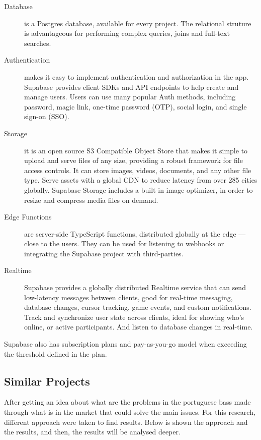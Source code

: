 \begin{description}
    \item [Database] is a Postgres database, available for every project. The relational struture is advantageous for performing complex queries, joins and full-text searches\cite{ZewdieAyezabu2022}.
    \item[Authentication] makes it easy to implement authentication and authorization in the app. Supabase provides client SDKs and API endpoints to help create and manage users. Users can use many popular Auth methods, including password, magic link, one-time password (OTP), social login, and single sign-on (SSO).\cite{supabaseAuth}
    \item[Storage] it is an open source S3 Compatible Object Store that makes it simple to upload and serve files of any size, providing a robust framework for file access controls. It can store images, videos, documents, and any other file type. Serve assets with a global CDN to reduce latency from over 285 cities globally. Supabase Storage includes a built-in image optimizer, in order to resize and compress media files on demand\cite{supabaseStorage}.
    \item [Edge Functions] are server-side TypeScript functions, distributed globally at the edge — close to the users. They can be used for listening to webhooks or integrating the Supabase project with third-parties.\cite{supabaseEdge}
    \item[Realtime] Supabase provides a globally distributed Realtime service that can send low-latency messages between clients, good for real-time messaging, database changes, cursor tracking, game events, and custom notifications. Track and synchronize user state across clients, ideal for showing who's online, or active participants. And listen to database changes in real-time.\cite{supabaseRealtime}
\end{description}

Supabase also has subscription plans and pay-as-you-go model when exceeding the threshold defined in the plan.


\subsection{Similar Projects}\label{subsec:similar-projects}

After getting an idea about what are the problems in the portuguese bass made through what is in the market that could solve the main issues.
For this research, different approach were taken to find results.
Below is shown the approach and the results, and then, the results will be analysed deeper.

